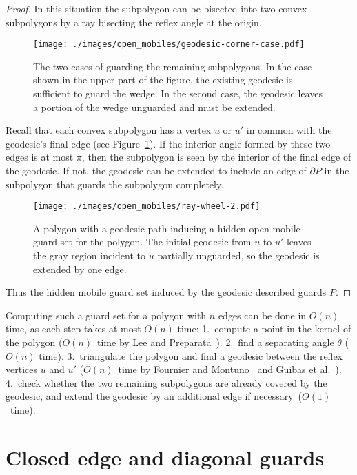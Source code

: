 \documentclass{cccg12}
\begin{document}
\begin{proof}
In this situation the subpolygon can be bisected into two convex subpolygons by a ray bisecting the reflex angle at the origin.

\begin{figure}[ht]
\centering
\texttt{[image: ./images/open\_mobiles/geodesic-corner-case.pdf]}
\caption{The two cases of guarding the remaining subpolygons.
In the case shown in the upper part of the figure, the existing geodesic is sufficient to guard the wedge.
In the second case, the geodesic leaves a portion of the wedge unguarded and must be extended.}
\label{fig:geodesic-corner-case}
\end{figure}

Recall that each convex subpolygon has a vertex $u$ or $u'$ in common with the geodesic's final edge (see Figure~\ref{fig:geodesic-corner-case}).
If the interior angle formed by these two edges is at most $\pi$, then the subpolygon is seen by the interior of the final edge of the geodesic.
If not, the geodesic can be extended to include an edge of $\partial P$ in the subpolygon that guards the subpolygon completely.

\begin{figure}[ht]
\centering
\texttt{[image: ./images/open\_mobiles/ray-wheel-2.pdf]}
\caption{A polygon with a geodesic path inducing a hidden open mobile guard set for the polygon.
The initial geodesic from $u$ to $u'$ leaves the gray region incident to $u$ partially unguarded, so the geodesic is extended by one edge.}
\label{fig:ray-wheel-2}
\end{figure}

Thus the hidden mobile guard set induced by the geodesic described guards $P$.
\end{proof}

Computing such a guard set for a polygon with $n$ edges can be done in $O(n)$ time, as each step takes at most $O(n)$ time:
1.~compute a point in the kernel of the polygon ($O(n)$~time by Lee and Preparata~\cite{Lee-1979}).
2.~find a separating angle $\theta$ ($O(n)$ time).
3.~triangulate the polygon and find a geodesic between the reflex vertices $u$ and $u'$ ($O(n)$~time by Fournier and Montuno~\cite{Fournier-1984} and Guibas et al.~\cite{Guibas-1987}).
4.~check whether the two remaining subpolygons are already covered by the geodesic, and extend the geodesic by an additional edge if necessary~($O(1)$~time).

\section{Closed edge and diagonal guards}
\end{document}
